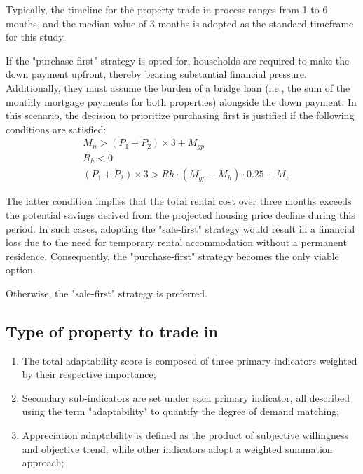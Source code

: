 \documentclass{mcmthesis}
\begin{document}
Typically, the timeline for the property trade-in process ranges from 1 to 6 months, 
and the median value of 3 months is adopted as the standard timeframe for this study.

If the "purchase-first" strategy is opted for, households are required to make the down payment upfront, 
thereby bearing substantial financial pressure. Additionally, they must assume the burden of a bridge loan 
(i.e., the sum of the monthly mortgage payments for both properties) alongside the down payment. In this scenario, 
the decision to prioritize purchasing first is justified if the following conditions are satisfied:
\begin{equation}
\begin{aligned}
&M_n>\left(P_1+P_2\right) \times 3+M_{g p}\\
& R_h<0 \\
& \left(P_1+P_2\right) \times 3>R h \cdot\left(M_{g p}-M_h\right) \cdot 0.25+M_z
\end{aligned}
\end{equation}

The latter condition implies that the total rental cost over three months exceeds the potential savings derived from 
the projected housing price decline during this period. In such cases, adopting the "sale-first" strategy would 
result in a financial loss due to the need for temporary rental accommodation without a permanent residence. Consequently, 
the "purchase-first" strategy becomes the only viable option.

Otherwise, the "sale-first" strategy is preferred.

\subsection{Type of property to trade in} %

\begin{enumerate}
    \item The total adaptability score is composed of three primary indicators weighted by their respective importance;
    \item Secondary sub-indicators are set under each primary indicator, all described using the term "adaptability" to quantify the degree of demand matching;
    \item Appreciation adaptability is defined as the product of subjective willingness and objective trend, while other indicators adopt a weighted summation approach;
\end{enumerate}
\end{document}
